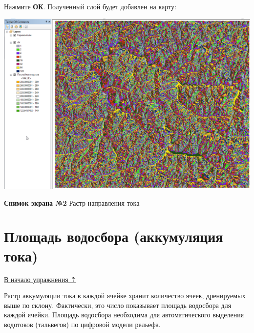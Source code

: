 \documentclass[]{book}
\theoremstyle{definition}
\theoremstyle{definition}
\theoremstyle{definition}
\theoremstyle{remark}
\begin{document}
Нажмите \textbf{ОК}. Полученный слой будет добавлен на карту:

\includegraphics{images/Ex17/image11.png}

\textbf{Снимок экрана №2} Растр направления тока

\hypertarget{dem-flowacc}{%
\section{Площадь водосбора (аккумуляция тока)}\label{dem-flowacc}}

\protect\hyperlink{dem-analysis}{В начало упражнения ⇡}

Растр аккумуляции тока в каждой ячейке хранит количество ячеек,
дренируемых выше по склону. Фактически, это число показывает площадь
водосбора для каждой ячейки. Площадь водосбора необходима для
автоматического выделения водотоков (тальвегов) по цифровой модели
рельефа.
\end{document}
